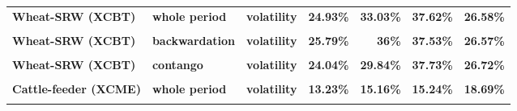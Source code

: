 \documentclass[
  authoryear,
  preprint,
  3p]{elsarticle}
\begin{document}
\begin{longtable}[t]{>{}l>{}l>{}l>{}r>{}r>{}r>{}r}
\textbf{Wheat-SRW (XCBT)} & \textbf{whole period} & \textbf{volatility} & \textcolor[HTML]{4285f4}{\textbf{24.93\%}} & \textcolor[HTML]{4285f4}{\textbf{33.03\%}} & \textcolor[HTML]{4285f4}{\textbf{37.62\%}} & \textcolor[HTML]{4285f4}{\textbf{26.58\%}}\\
\textbf{\cellcolor{gray!10}{Wheat-SRW (XCBT)}} & \textbf{\cellcolor{gray!10}{backwardation}} & \textbf{\cellcolor{gray!10}{mean}} & \textcolor[HTML]{4285f4}{\textbf{\cellcolor{gray!10}{-2.7\%}}} & \textcolor[HTML]{4285f4}{\textbf{\cellcolor{gray!10}{19.02\%}}} & \textcolor[HTML]{4285f4}{\textbf{\cellcolor{gray!10}{0.98\%}}} & \textcolor[HTML]{4285f4}{\textbf{\cellcolor{gray!10}{0.44\%}}}\\
\textbf{Wheat-SRW (XCBT)} & \textbf{backwardation} & \textbf{volatility} & \textcolor[HTML]{4285f4}{\textbf{25.79\%}} & \textcolor[HTML]{4285f4}{\textbf{36\%}} & \textcolor[HTML]{4285f4}{\textbf{37.53\%}} & \textcolor[HTML]{4285f4}{\textbf{26.57\%}}\\
\textbf{\cellcolor{gray!10}{Wheat-SRW (XCBT)}} & \textbf{\cellcolor{gray!10}{contango}} & \textbf{\cellcolor{gray!10}{mean}} & \textcolor[HTML]{4285f4}{\textbf{\cellcolor{gray!10}{11.78\%}}} & \textcolor[HTML]{4285f4}{\textbf{\cellcolor{gray!10}{16.29\%}}} & \textcolor[HTML]{4285f4}{\textbf{\cellcolor{gray!10}{14.57\%}}} & \textcolor[HTML]{4285f4}{\textbf{\cellcolor{gray!10}{-2.77\%}}}\\
\addlinespace
\textbf{Wheat-SRW (XCBT)} & \textbf{contango} & \textbf{volatility} & \textcolor[HTML]{4285f4}{\textbf{24.04\%}} & \textcolor[HTML]{4285f4}{\textbf{29.84\%}} & \textcolor[HTML]{4285f4}{\textbf{37.73\%}} & \textcolor[HTML]{4285f4}{\textbf{26.72\%}}\\
\textbf{\cellcolor{gray!10}{Cattle-feeder (XCME)}} & \textbf{\cellcolor{gray!10}{whole period}} & \textbf{\cellcolor{gray!10}{mean}} & \textcolor[HTML]{4285f4}{\textbf{\cellcolor{gray!10}{0.39\%}}} & \textcolor[HTML]{4285f4}{\textbf{\cellcolor{gray!10}{7.43\%}}} & \textcolor[HTML]{4285f4}{\textbf{\cellcolor{gray!10}{7.13\%}}} & \textcolor[HTML]{4285f4}{\textbf{\cellcolor{gray!10}{1.87\%}}}\\
\textbf{Cattle-feeder (XCME)} & \textbf{whole period} & \textbf{volatility} & \textcolor[HTML]{4285f4}{\textbf{13.23\%}} & \textcolor[HTML]{4285f4}{\textbf{15.16\%}} & \textcolor[HTML]{4285f4}{\textbf{15.24\%}} & \textcolor[HTML]{4285f4}{\textbf{18.69\%}}\\
\textbf{\cellcolor{gray!10}{Cattle-feeder (XCME)}} & \textbf{\cellcolor{gray!10}{backwardation}} & \textbf{\cellcolor{gray!10}{mean}} & \textcolor[HTML]{4285f4}{\textbf{\cellcolor{gray!10}{2.31\%}}} & \textcolor[HTML]{4285f4}{\textbf{\cellcolor{gray!10}{**20.52\%}}} & \textcolor[HTML]{4285f4}{\textbf{\cellcolor{gray!10}{7.51\%}}} & \textcolor[HTML]{4285f4}{\textbf{\cellcolor{gray!10}{6.58\%}}}\\

\end{longtable}
\end{document}
